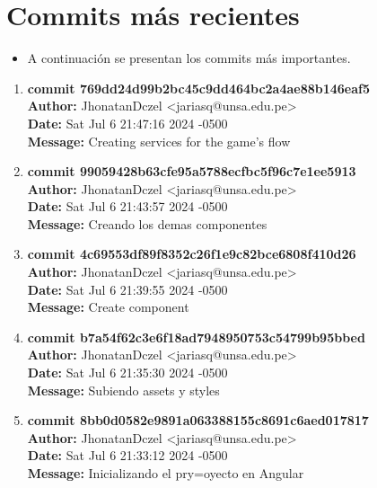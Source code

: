 \section{Commits más recientes}
\begin{itemize}
    \item A continuación se presentan los commits más importantes.
\end{itemize}


\begin{enumerate}[label=Commit \arabic*]
    \item \textbf{commit 769dd24d99b2bc45c9dd464bc2a4ae88b146eaf5} \\
    \textbf{Author:} JhonatanDczel <jariasq@unsa.edu.pe> \\
    \textbf{Date:} Sat Jul 6 21:47:16 2024 -0500 \\
    \textbf{Message:} Creating services for the game's flow

    \item \textbf{commit 99059428b63cfe95a5788ecfbc5f96c7e1ee5913} \\
    \textbf{Author:} JhonatanDczel <jariasq@unsa.edu.pe> \\
    \textbf{Date:} Sat Jul 6 21:43:57 2024 -0500 \\
    \textbf{Message:} Creando los demas componentes

    \item \textbf{commit 4c69553df89f8352c26f1e9c82bce6808f410d26} \\
    \textbf{Author:} JhonatanDczel <jariasq@unsa.edu.pe> \\
    \textbf{Date:} Sat Jul 6 21:39:55 2024 -0500 \\
    \textbf{Message:} Create component

    \item \textbf{commit b7a54f62c3e6f18ad7948950753c54799b95bbed} \\
    \textbf{Author:} JhonatanDczel <jariasq@unsa.edu.pe> \\
    \textbf{Date:} Sat Jul 6 21:35:30 2024 -0500 \\
    \textbf{Message:} Subiendo assets y styles

    \item \textbf{commit 8bb0d0582e9891a063388155c8691c6aed017817} \\
    \textbf{Author:} JhonatanDczel <jariasq@unsa.edu.pe> \\
    \textbf{Date:} Sat Jul 6 21:33:12 2024 -0500 \\
    \textbf{Message:} Inicializando el pry=oyecto en Angular


\end{enumerate}
